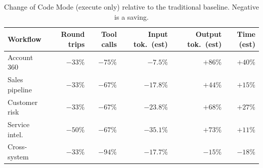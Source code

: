 \documentclass[11pt]{article}
\begin{document}
\begin{table}[t]
\centering\small
\caption{Change of Code Mode (execute only) relative to the traditional baseline. Negative is a saving.}
\label{tab:savings}
\begin{tabular}{lrrrrr}
\toprule
Workflow & Round trips & Tool calls & Input tok.\ (est) & Output tok.\ (est) & Time (est)\\
\midrule
Account 360 & $-33\%$ & $-75\%$ & $-7.5\%$ & $+86\%$ & $+40\%$\\
Sales pipeline & $-33\%$ & $-67\%$ & $-17.8\%$ & $+44\%$ & $+15\%$\\
Customer risk & $-33\%$ & $-67\%$ & $-23.8\%$ & $+68\%$ & $+27\%$\\
Service intel. & $-50\%$ & $-67\%$ & $-35.1\%$ & $+73\%$ & $+11\%$\\
Cross-system & $-33\%$ & $-94\%$ & $-17.7\%$ & $-15\%$ & $-18\%$\\
\bottomrule
\end{tabular}
\end{table}
\end{document}
